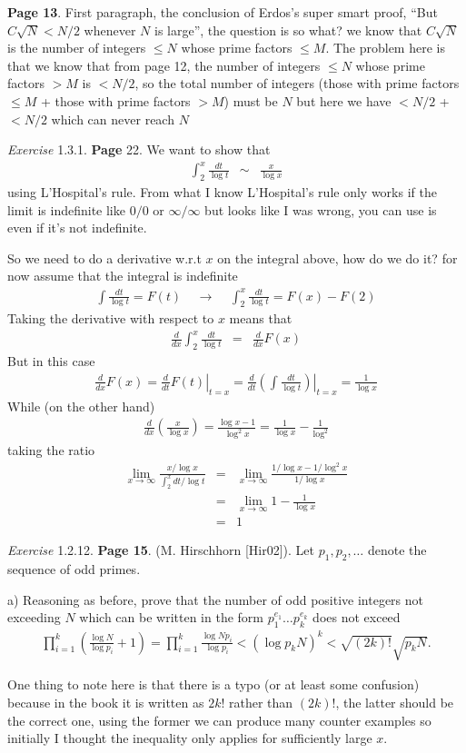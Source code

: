 \documentclass[aps,preprint,preprintnumbers,nofootinbib,showpacs,prd]{revtex4-1}
\newcommand{\nbea}{\begin{eqnarray*}}
\newcommand{\neea}{\end{eqnarray*}}
\begin{document}
{\bf Page 13}. First paragraph, the conclusion of Erdos's super smart proof, ``But $C\sqrt{N} < N/2$ whenever $N$ is large'', the question is so what? we know that $C\sqrt{N}$ is the number of integers $\le N$ whose prime factors $\le M$. The problem here is that we know that from page 12, the number of integers $\le N$ whose prime factors $> M$ is $< N/2$, so the total number of integers (those with prime factors $\le M$ + those with prime factors $> M$) must be $N$ but here we have $< N/2$ + $< N/2$ which can never reach $N$

{\it Exercise } 1.3.1. {\bf Page} 22. We want to show that
%
\nbea
\int_2^x \frac{dt}{\log t} & \sim & \frac{x}{\log x}
\neea
%
using L'Hospital's rule. From what I know L'Hospital's rule only works if the limit is indefinite like $0/0$ or $\infty/\infty$ but looks like I was wrong, you can use is even if it's not indefinite.

So we need to do a derivative w.r.t $x$ on the integral above, how do we do it? for now assume that the integral is indefinite
%
\nbea
\int \frac{dt}{\log t} = F(t) ~~~~~ \longrightarrow ~~~~~ \int_2^x \frac{dt}{\log t} = F(x) - F(2)
\neea
%
Taking the derivative with respect to $x$ means that
%
\nbea
\frac{d}{dx} \int_2^x \frac{dt}{\log t} & = & \frac{d}{dx} F(x)
\neea
%
But in this case
%
\nbea
\frac{d}{dx} F(x) = \left.\frac{d}{dt}F(t) \right|_{t = x} = \left.\frac{d}{dt}\left(\int \frac{dt}{\log t}\right) \right|_{t = x} = \frac{1}{\log x}
\neea
%
While (on the other hand)
%
\nbea
\frac{d}{dx} \left ( \frac{x}{\log x} \right )  = \frac{\log x - 1}{\log^2 x} = \frac{1}{\log x} - \frac{1}{\log^2}
\neea
%
taking the ratio
%
\nbea
\lim_{x\to\infty} \frac{x/\log x}{\int_2^x dt/\log t} & = & \lim_{x\to\infty} \frac{1/\log x - 1/\log^2x}{1/\log x} \\
& = & \lim_{x\to\infty} 1 - \frac{1}{\log x} \\
& = & 1
\neea
%

{\it Exercise} 1.2.12. {\bf Page 15}. (M. Hirschhorn [Hir02]). Let $p_1 , p_2 , \dots$ denote the sequence of odd primes.

a) Reasoning as before, prove that the number of odd positive integers not exceeding $N$ which can be written in the form $p^{e_1}_1 \dots p^{e_k}_k$ does not exceed 
%
\nbea
\prod^k_{i=1} \left( \frac{\log N}{\log p_i} + 1 \right ) = \prod^k_{i=1} \frac{\log Np_i}{\log p_i} < (\log p_k N)^k < \sqrt{(2k)!} \sqrt{p_k N}.
\neea
%

One thing to note here is that there is a typo (or at least some confusion) because in the book it is written as $2k!$ rather than $(2k)!$, the latter should be the correct one, using the former we can produce many counter examples so initially I thought the inequality only applies for sufficiently large $x$.
\end{document}
